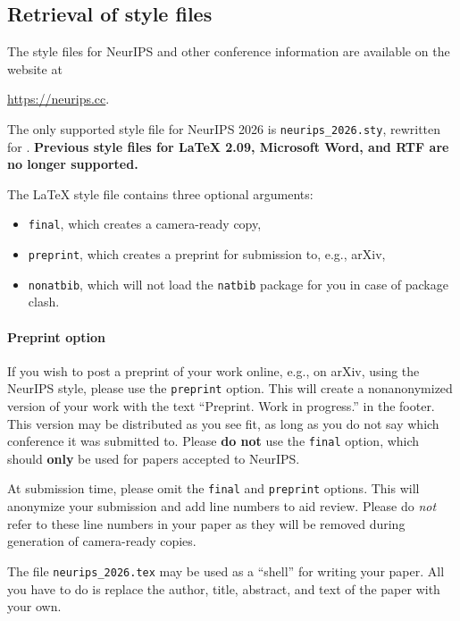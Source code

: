 \documentclass{article}
\begin{document}
\subsection{Retrieval of style files}


The style files for NeurIPS and other conference information are available on the website at
\begin{center}
  \url{https://neurips.cc}.
\end{center}


The only supported style file for NeurIPS 2026 is \verb+neurips_2026.sty+, rewritten for \LaTeXe{}. \textbf{Previous style files for \LaTeX{} 2.09,  Microsoft Word, and RTF are no longer supported.}


The \LaTeX{} style file contains three optional arguments: 
\begin{itemize}
\item \verb+final+, which creates a camera-ready copy, 
\item \verb+preprint+, which creates a preprint for submission to, e.g., arXiv, \item \verb+nonatbib+, which will not load the \verb+natbib+ package for you in case of package clash.
\end{itemize}


\paragraph{Preprint option}
If you wish to post a preprint of your work online, e.g., on arXiv, using the NeurIPS style, please use the \verb+preprint+ option. This will create a nonanonymized version of your work with the text ``Preprint. Work in progress.'' in the footer. This version may be distributed as you see fit, as long as you do not say which conference it was submitted to. Please \textbf{do not} use the \verb+final+ option, which should \textbf{only} be used for papers accepted to NeurIPS.


At submission time, please omit the \verb+final+ and \verb+preprint+ options. This will anonymize your submission and add line numbers to aid review. Please do \emph{not} refer to these line numbers in your paper as they will be removed during generation of camera-ready copies.


The file \verb+neurips_2026.tex+ may be used as a ``shell'' for writing your paper. All you have to do is replace the author, title, abstract, and text of the paper with your own.
\end{document}

